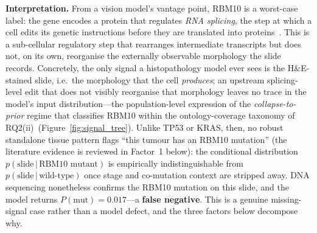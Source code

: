 \textbf{Interpretation.}
From a vision model's vantage point, RBM10 is a worst-case
label: the gene encodes a protein that regulates \emph{RNA
splicing}, the step at which a cell edits its genetic
instructions before they are translated into
proteins~\cite{bechara2013rbm10}.
This is a sub-cellular regulatory step that rearranges
intermediate transcripts but does not, on its own, reorganise the
externally observable morphology the slide records.
Concretely, the only signal a histopathology model ever sees is
the H\&E-stained slide, i.e.\ the morphology that the cell
\emph{produces}; an upstream splicing-level edit that does not
visibly reorganise that morphology leaves no trace in the model's
input distribution---the population-level expression of the
\emph{collapse-to-prior} regime that classifies RBM10 within the
ontology-coverage taxonomy of
RQ2(ii)~(Figure~\ref{fig:signal_tree}).
Unlike TP53 or KRAS, then, no robust standalone tissue pattern
flags ``this tumour has an RBM10 mutation'' (the literature
evidence is reviewed in Factor~1 below): the conditional
distribution $p(\text{slide}\,|\,\text{RBM10 mutant})$ is
empirically indistinguishable from $p(\text{slide}\,|\,\text{wild-type})$
once stage and co-mutation context are stripped away.
DNA sequencing nonetheless confirms the RBM10 mutation on this
slide, and the model returns $P(\text{mut}) = 0.017$---a
\textbf{false negative}.
This is a genuine missing-signal case rather than a model defect,
and the three factors below decompose why.

